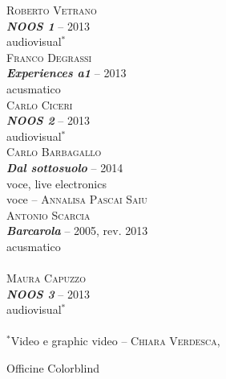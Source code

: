 \documentclass[9pt, twoside, a5paper]{extreport}
\newcommand{\brano}[6]{%
\noindent \textsc{#1}\\ %
\noindent \textbf{\textit{#2}} -- #3\\%
\noindent #4\\ %
\noindent #5 -- \textsc{#6}%
\\
}%
\newcommand{\installazione}[4]{%
\noindent \textsc{#1}\\ %
\noindent \textbf{\textit{#2}} -- #3\\%
\noindent #4%
\\
}%
\begin{document}
\begin{multicols}{2}


\installazione{Roberto Vetrano}
{NOOS 1}{2013}
{audiovisual$^\ast$}

\installazione{Franco Degrassi}
{Experiences a1}{2013}
{acusmatico}

\installazione{Carlo Ciceri}
{NOOS 2}{2013}
{audiovisual$^\ast$}

\brano{Carlo Barbagallo}
{Dal sottosuolo}{2014}
{voce, live electronics}
{voce}{Annalisa Pascai Saiu}

\installazione{Antonio Scarcia}
{Barcarola}{2005, rev. 2013 }
{acusmatico}
\\

\installazione{Maura Capuzzo}
{NOOS 3}{2013}
{audiovisual$^\ast$}
\\

\noindent $^\ast$Video e graphic video -- \textsc{Chiara Verdesca}, 

\noindent Officine Colorblind 
\\
\medskip


\end{multicols}
\end{document}
